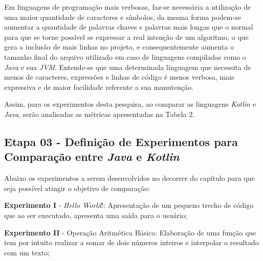     


Em linguagens de programação mais verbosas, faz-se necessária a utilização de uma maior quantidade de caracteres e símbolos, da mesma forma podem-se aumentar a quantidade de palavras chaves e palavras mais longas que o normal para que se torne possível se expressar a real intenção de um algoritmo, o que gera a inclusão de mais linhas no projeto, e consequentemente aumenta o tamanho final do arquivo utilizado em caso de linguagens compiladas como o \textit{Java} e sua \textit{JVM}. Entende-se que uma determinada linguagem que necessita de menos de caracteres, expressões e linhas de código é menos verbosa, mais expressiva e de maior facilidade referente a sua manutenção.

Assim, para os experimentos desta pesquisa, ao comparar as linguagens \textit{Kotlin} e \textit{Java}, serão analisadas as métricas apresentadas na Tabela 2.

\subsection{Etapa 03 - Definição de Experimentos para Comparação entre \textit{Java} e \textit{Kotlin}}

Abaixo os experimentos a serem desenvolvidos no decorrer do capítulo para que seja possível atingir o objetivo de comparação:

\textbf{Experimento I} - \textit{Hello World}!: Apresentação de um pequeno trecho de código que ao ser executado, apresenta uma saída para o usuário;

\textbf{Experimento II} - Operação Aritmética Básica: Elaboração de uma função que tem por intuito realizar a somar de dois números inteiros e interpolar o resultado com um texto;


